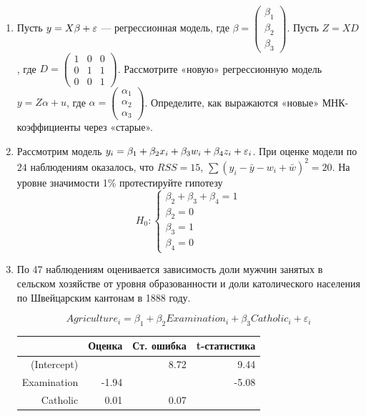 \documentclass[12pt, a4paper]{article}\usepackage[]{graphicx}\usepackage[]{color}
\begin{document}
\begin{enumerate}
\item Пусть $y = X\beta + \varepsilon$ — регрессионная модель, где $\beta = \begin{pmatrix} \beta_1 \\ \beta_2 \\ \beta_3 \end{pmatrix}$. Пусть $Z = XD$, где $D = \begin{pmatrix} 1 & 0 & 0 \\ 0 & 1 & 1 \\ 0 & 0 & 1 \end{pmatrix}$. Рассмотрите «новую» регрессионную модель $y = Z\alpha + u$, где $\alpha = \begin{pmatrix} \alpha_1 \\ \alpha_2 \\ \alpha_3 \end{pmatrix}$. Определите, как выражаются «новые» МНК-коэффициенты через «старые».
\item  Рассмотрим модель $y_i = \beta_1+ \beta_2 x_i + \beta_3 w_i +\beta_4 z_i + \varepsilon_i$.  При оценке модели по $24$ наблюдениям оказалось, что $RSS=15$, $\sum (y_i-\bar{y}-w_i+\bar{w})^2=20$. На уровне значимости 1\% протестируйте гипотезу
\[
H_0:
\begin{cases}
\beta_2+\beta_3+\beta_4=1 \\
\beta_2=0 \\
\beta_3=1 \\
\beta_4=0
\end{cases}
\]
\item  По 47 наблюдениям оценивается зависимость доли мужчин занятых в сельском хозяйстве от уровня образованности и доли католического населения по Швейцарским кантонам в 1888 году.

\[Agriculture_i=\beta_1+\beta_2 Examination_i+\beta_3 Catholic_i+\varepsilon_i\]





\begin{table}[ht]
\centering
\begin{tabular}{rrrr}
  \hline
 & Оценка & Ст. ошибка & t-статистика \\ 
  \hline
(Intercept) &  & 8.72 & 9.44 \\ 
  Examination & -1.94 &  & -5.08 \\ 
  Catholic & 0.01 & 0.07 &  \\ 
   \hline
\end{tabular}
\end{table}



\end{enumerate}
\end{document}
